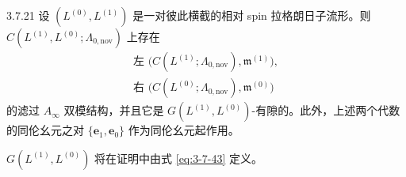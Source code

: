 \begin{theorem}{3.7.21}\label{thm:3-7-21}
设 $(L^{(0)},L^{(1)})$ 是一对彼此横截的相对 spin 拉格朗日子流形。则
$C(L^{(1)},L^{(0)};\Lambda_{0,\mathrm{nov}})$ 上存在
\[
 \begin{gathered}
 \text{左 }\bigl(C(L^{(1)};\Lambda_{0,\mathrm{nov}}),\mathfrak m^{(1)}\bigr),\\
 \text{右 }\bigl(C(L^{(0)};\Lambda_{0,\mathrm{nov}}),\mathfrak m^{(0)}\bigr)
 \end{gathered}
\]
的滤过 $A_\infty$ 双模结构，并且它是
$G(L^{(1)},L^{(0)})$-有隙的。此外，上述两个代数的同伦幺元之对
$\{\mathbf e_1,\mathbf e_0\}$ 作为同伦幺元起作用。
\end{theorem}

$G(L^{(1)},L^{(0)})$ 将在证明中由式 \eqref{eq:3-7-43} 定义。

